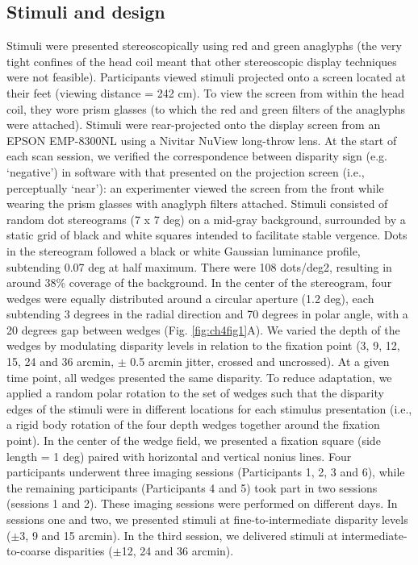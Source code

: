 \subsection{Stimuli and design}
Stimuli were presented stereoscopically using red and green anaglyphs (the very tight confines of the head coil meant that other stereoscopic display techniques were not feasible). Participants viewed stimuli projected onto a screen located at their feet (viewing distance = 242 cm). To view the screen from within the head coil, they wore prism glasses (to which the red and green filters of the anaglyphs were attached). Stimuli were rear-projected onto the display screen from an EPSON EMP-8300NL using a Nivitar NuView long-throw lens. At the start of each scan session, we verified the correspondence between disparity sign (e.g. `negative') in software with that presented on the projection screen (i.e., perceptually `near'): an experimenter viewed the screen from the front while wearing the prism glasses with anaglyph filters attached.
Stimuli consisted of random dot stereograms (7 x 7 deg) on a mid-gray background, surrounded by a static grid of black and white squares intended to facilitate stable vergence. Dots in the stereogram followed a black or white Gaussian luminance profile, subtending 0.07 deg at half maximum. There were 108 dots/deg2, resulting in around 38\% coverage of the background. In the center of the stereogram, four wedges were equally distributed around a circular aperture (1.2 deg), each subtending 3 degrees in the radial direction and 70 degrees in polar angle, with a 20 degrees gap between wedges (Fig. \ref{fig:ch4fig1}A). We varied the depth of the wedges by modulating disparity levels in relation to the fixation point (3, 9, 12, 15, 24 and 36 arcmin, $\pm$ 0.5 arcmin jitter, crossed and uncrossed). At a given time point, all wedges presented the same disparity. To reduce adaptation, we applied a random polar rotation to the set of wedges such that the disparity edges of the stimuli were in different locations for each stimulus presentation (i.e., a rigid body rotation of the four depth wedges together around the fixation point). In the center of the wedge field, we presented a fixation square (side length = 1 deg) paired with horizontal and vertical nonius lines.
Four participants underwent three imaging sessions (Participants 1, 2, 3 and 6), while the remaining participants (Participants 4 and 5) took part in two sessions (sessions 1 and 2). These imaging sessions were performed on different days. In sessions one and two, we presented stimuli at fine-to-intermediate disparity levels ($\pm$3, 9 and 15 arcmin). In the third session, we delivered stimuli at intermediate-to-coarse disparities ($\pm$12, 24 and 36 arcmin). 
